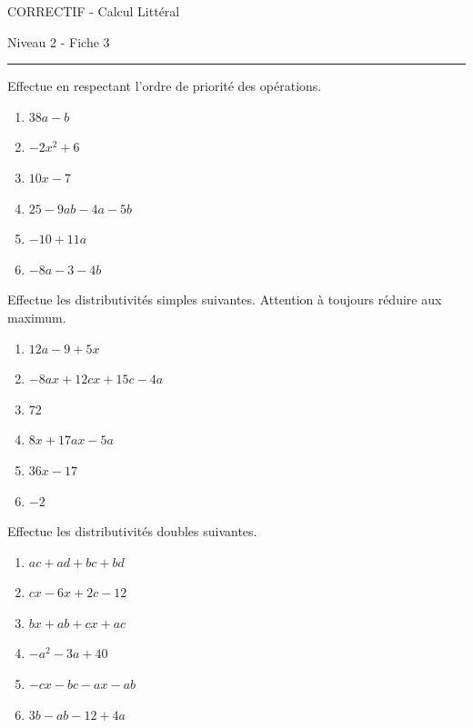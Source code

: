 \documentclass[12pt,parskip=half-, twoside=semi]{scrartcl}
\begin{document}
\begin{center}
  \bfseries
  \begin{Huge}
    CORRECTIF - Calcul Littéral
  \end{Huge}
  \smallbreak
  \begin{large}
    Niveau 2  - Fiche 3
  \end{large}
  \smallbreak
  \rule[10pt]{.5\linewidth}{1 pt}
\end{center}

\setcounter{exercise}{0}

\begin{exercise}Effectue en respectant l'ordre de priorité des opérations.
  \begin{enumerate}[cols=2]
    \item $38a-b$
    \item $-2x^2+6$
    \item $10x-7$
    \item $25-9ab-4a-5b$
    \item $-10+11a$
    \item $-8a-3-4b$
  \end{enumerate}
\end{exercise}
 
\begin{exercise}Effectue les distributivités simples suivantes. Attention à toujours réduire aux maximum.
  \begin{enumerate}[cols=2]
    \item $12a-9+5x$
    \item $-8ax+12cx+15c-4a$
    \item $72$
    \item $8x+17ax-5a$
    \item $36x-17$
    \item $-2$
  \end{enumerate}
\end{exercise}


\begin{exercise}Effectue les distributivités doubles suivantes.
  \begin{enumerate}[cols=3]
    \item $ac+ad+bc+bd$
    \item $cx-6x+2c-12$
    \item $bx+ab+cx+ac$
    \item $-a^2-3a+40$
    \item $-cx-bc-ax-ab$
    \item $3b-ab-12+4a$
  \end{enumerate}
\end{exercise}
\end{document}
